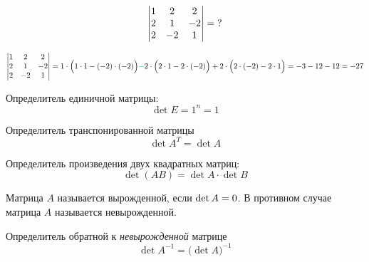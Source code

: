 \documentclass[a4paper,12pt]{article}
\begin{document}
  \begin{problem}[14.7(3)]
    \[
      \begin{vmatrix}
        1 & 2 & 2\\
        2 & 1 & -2\\
        2 & -2 & 1
      \end{vmatrix} = \operatorname{?}
    \]
  \end{problem}
  
  \begin{solution}
    \[
      \begin{vmatrix}
        1 & 2 & 2\\
        2 & 1 & -2\\
        2 & -2 & 1
      \end{vmatrix}
      = 1 \cdot \Bigl(1 \cdot 1 - (-2) \cdot (-2)\Bigr)
        \textcolor{light-cyan}{-} 2 \cdot \Bigl(2 \cdot 1 - 2 \cdot (-2)\Bigr)
        + 2 \cdot \Bigl(2 \cdot (-2) - 2 \cdot 1\Bigr)
      = -3 - 12 - 12
      = -27
    \]
  \end{solution}
  
  \begin{example}
    Определитель единичной матрицы:
    \[
      \det E = 1^n = 1
    \]
  \end{example}

  \begin{theorem}
    Определитель транспонированной матрицы
    \[
      \det A^T = \det A
    \]
  \end{theorem}
  
  \begin{theorem}
    Определитель произведения двух квадратных матриц:
    \[
      \det (AB) = \det A \cdot \det B
    \]
  \end{theorem}
  
  \begin{definition}[Вырожденная матрица\footnote{Определение вырожденной матрицы можно вводить по-разному. Ещё возможный вариант: квадратная матрица называется вырожденной, если её строки $\{\bds a_i\}_{i=1}^n$ линейно зависимы. Строки линейно зависимы~---~когда существует нетривиальная линейная комбинация строк, которая даёт нулевую строку: $\sum_{i=1}^n \alpha_i \bds a_i \hm= \bds 0$, $\sum_{i=1}^n \alpha_i^2 \hm > 0$.}]
    Матрица $A$ называется вырожденной, если $\det A \hm= 0$.
    В противном случае матрица $A$ называется невырожденной.
  \end{definition}
  
  \begin{theorem}
    Определитель обратной к \emph{невырожденной} матрице
    \[
      \det A^{-1} = \bigl(\det A\bigl)^{-1}
    \]
  \end{theorem}
  
\end{document}
